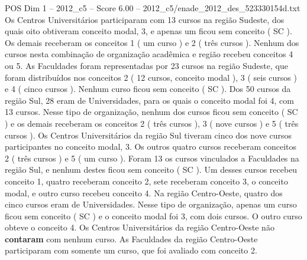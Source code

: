 \begin{textsample}{POS Dim 1 – 2012\_c5 – Score 6.00 – 2012\_c5/enade\_2012\_des\_523330154d.txt}
Os Centros Universitários participaram com 13 cursos na região Sudeste, dos quais oito obtiveram conceito modal, 3, e apenas um ficou sem conceito ( SC ).
Os demais receberam os conceitos 1 ( um curso ) e 2 ( três cursos ).
Nenhum dos cursos nesta combinação de organização acadêmica e região recebeu conceitos 4 ou 5.
As Faculdades foram representadas por 23 cursos na região Sudeste, que foram distribuídos nos conceitos 2 ( 12 cursos, conceito modal ), 3 ( seis cursos ) e 4 ( cinco cursos ).
Nenhum curso ficou sem conceito ( SC ).
Dos 50 cursos da região Sul, 28 eram de Universidades, para os quais o conceito modal foi 4, com 13 cursos.
Nesse tipo de organização, nenhum dos cursos ficou sem conceito ( SC ) e os demais receberam os conceitos 2 ( três cursos ), 3 ( nove cursos ) e 5 ( três cursos ).
Os Centros Universitários da região Sul tiveram cinco dos nove cursos participantes no conceito modal, 3.
Os outros quatro cursos receberam conceitos 2 ( três cursos ) e 5 ( um curso ).
Foram 13 os cursos vinculados a Faculdades na região Sul, e nenhum destes ficou sem conceito ( SC ).
Um desses cursos recebeu conceito 1, quatro receberam conceito 2, sete receberam conceito 3, o conceito modal, e outro curso recebeu conceito 4.
Na região Centro-Oeste, quatro dos cinco cursos eram de Universidades.
Nesse tipo de organização, apenas um curso ficou sem conceito ( SC ) e o conceito modal foi 3, com dois cursos.
O outro curso obteve o conceito 4.
Os Centros Universitários da região Centro-Oeste não \textbf{contaram} com nenhum curso.
As Faculdades da região Centro-Oeste participaram com somente um curso, que foi avaliado com conceito 2.

\end{textsample}
